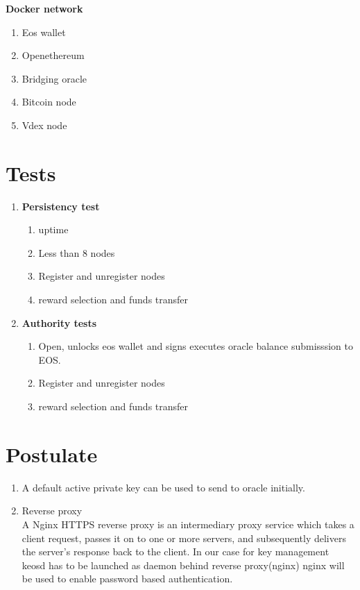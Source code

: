 \documentclass[]{article}
\begin{document}
   \textbf{Docker network}\\
  \begin{enumerate}
  	\item Eos wallet
  	\item Openethereum
  	\item Bridging oracle
  	\item Bitcoin node
  	\item Vdex node
  \end{enumerate}

\section{Tests}
					\begin{enumerate}
						\item \textbf{Persistency test}
							\begin{enumerate}
								\item uptime\textit{}
								\item Less than 8 nodes 
								\item Register and unregister nodes
								\item reward selection and funds transfer	
							\end{enumerate}
						\item \textbf{Authority tests}
							\begin{enumerate}
							\item Open, unlocks eos wallet and signs executes oracle balance submisssion to EOS.
							\item Register and unregister nodes
							\item reward selection and funds transfer	
						\end{enumerate}
				\end{enumerate}
\section{Postulate}
\begin{enumerate}
	\item A default active private key can be used to send to oracle initially.
	\item Reverse proxy \\
	A Nginx HTTPS reverse proxy is an intermediary proxy service which takes a client request, passes it on to one or more servers, and subsequently delivers the server's response back to the client. 
	In our case for key management keosd has to be launched as daemon behind reverse proxy(nginx)
	nginx will be used to enable password based authentication.
\end{enumerate}
\end{document}
